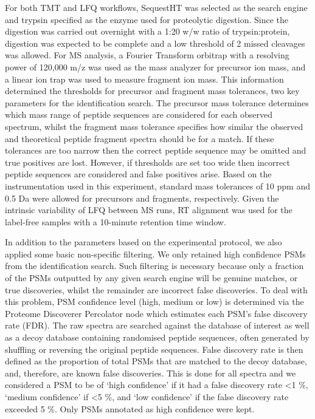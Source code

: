 \documentclass[9pt,a4paper,]{extarticle}
\begin{document}
For both TMT and LFQ workflows, SequestHT was selected as the search engine and
trypsin specified as the enzyme used for proteolytic digestion. Since the
digestion was carried out overnight with a 1:20 w/w ratio of trypsin:protein,
digestion was expected to be complete and a low threshold of 2 missed cleavages
was allowed. For MS analysis, a Fourier Transform orbitrap with a resolving
power of 120,000 m/z was used as the mass analyzer for precursor ion mass, and a
linear ion trap was used to measure fragment ion mass. This information
determined the thresholds for precursor and fragment mass tolerances, two key
parameters for the identification search. The precursor mass tolerance
determines which mass range of peptide sequences are considered for each
observed spectrum, whilst the fragment mass tolerance specifies how similar the
observed and theoretical peptide fragment spectra should be for a match. If
these tolerances are too narrow then the correct peptide sequence may be omitted
and true positives are lost. However, if thresholds are set too wide then
incorrect peptide sequences are considered and false positives arise. Based on
the instrumentation used in this experiment, standard mass tolerances of 10 ppm
and 0.5 Da were allowed for precursors and fragments, respectively. Given the
intrinsic variability of LFQ between MS runs, RT alignment was used for the
label-free samples with a 10-minute retention time window.

In addition to the parameters based on the experimental protocol, we also
applied some basic non-specific filtering. We only retained high confidence PSMs
from the identification search. Such filtering is necessary because only a
fraction of the PSMs outputted by any given search engine will be genuine
matches, or true discoveries, whilst the remainder are incorrect false
discoveries. To deal with this problem, PSM confidence level (high, medium or
low) is determined via the Proteome Discoverer Percolator node \citep{Kll2007} which
estimates each PSM's false discovery rate (FDR). The raw spectra are searched
against the database of interest as well as a decoy database containing
randomised peptide sequences, often generated by shuffling or reversing the
original peptide sequences. False discovery rate is then defined as the
proportion of total PSMs that are matched to the decoy database, and, therefore,
are known false discoveries. This is done for all spectra and we considered a
PSM to be of `high confidence' if it had a false discovery rate \textless1 \%, `medium
confidence' if \textless5 \%, and `low confidence' if the false discovery rate exceeded
5 \%. Only PSMs annotated as high confidence were kept.
\end{document}
